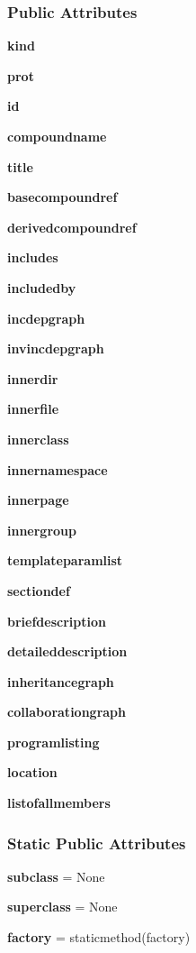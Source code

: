 \subsubsection*{Public Attributes}
\begin{DoxyCompactItemize}
\item 
{\bf kind}
\item 
{\bf prot}
\item 
{\bf id}
\item 
{\bf compoundname}
\item 
{\bf title}
\item 
{\bf basecompoundref}
\item 
{\bf derivedcompoundref}
\item 
{\bf includes}
\item 
{\bf includedby}
\item 
{\bf incdepgraph}
\item 
{\bf invincdepgraph}
\item 
{\bf innerdir}
\item 
{\bf innerfile}
\item 
{\bf innerclass}
\item 
{\bf innernamespace}
\item 
{\bf innerpage}
\item 
{\bf innergroup}
\item 
{\bf templateparamlist}
\item 
{\bf sectiondef}
\item 
{\bf briefdescription}
\item 
{\bf detaileddescription}
\item 
{\bf inheritancegraph}
\item 
{\bf collaborationgraph}
\item 
{\bf programlisting}
\item 
{\bf location}
\item 
{\bf listofallmembers}
\end{DoxyCompactItemize}
\subsubsection*{Static Public Attributes}
\begin{DoxyCompactItemize}
\item 
{\bf subclass} = None
\item 
{\bf superclass} = None
\item 
{\bf factory} = staticmethod(factory)
\end{DoxyCompactItemize}


